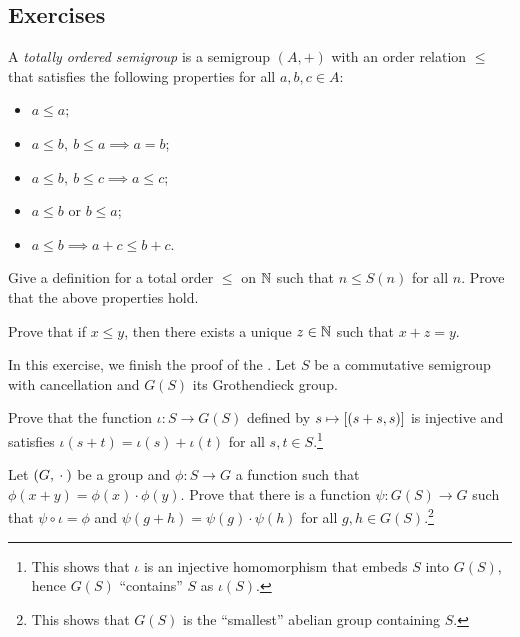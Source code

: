 \documentclass[master.tex]{subfiles}
\begin{document}
\subsection*{Exercises}
\begin{exercises}
    \item A \emph{totally ordered semigroup} is a semigroup $(A, +)$ with an order relation $\leq$ that satisfies the following properties for all $a, b, c \in A$:
    \begin{itemize}
        \item $a \leq a$;
        \item $a \leq b, \ b \leq a \implies a = b$;
        \item $a \leq b, \ b \leq c \implies a \leq c$;
        \item $a \leq b$ or $b \leq a$;
        \item $a \leq b \implies a + c \leq b + c$.
    \end{itemize}
    \begin{exercises}
        \item Give a definition for a total order $\leq$ on $\mathbb{N}$ such that $n \leq S(n)$ for all $n$.
        Prove that the above properties hold.
        \item Prove that if $x \leq y$, then there exists a unique $z \in \mathbb{N}$ such that $x + z = y$.
    \end{exercises}

    \item In this exercise, we finish the proof of the .
    Let $S$ be a commutative semigroup with cancellation and $G(S)$ its Grothendieck group.
    \begin{exercises}
        \item Prove that the function $\iota : S \rightarrow G(S)$ defined by $s \mapsto \left[ (s + s, s) \right]$ is injective and satisfies $\iota(s + t) = \iota(s) + \iota(t)$ for all $s, t \in S$.\footnote{
            This shows that $\iota$ is an injective homomorphism that embeds $S$ into $G(S)$, hence $G(S)$ ``contains'' $S$ as $\iota(S)$.
        }
        \item Let $(G, {}\cdot{}{})$ be a group and $\phi : S \rightarrow G$ a function such that $\phi(x + y) = \phi(x) \cdot \phi(y)$.
        Prove that there is a function $\psi : G(S) \rightarrow G$ such that $\psi \circ \iota = \phi$ and $\psi(g + h) = \psi(g) \cdot \psi(h)$ for all $g, h \in G(S)$.\footnote{
            This shows that $G(S)$ is the ``smallest'' abelian group containing $S$.
        }
    \end{exercises}


\end{exercises}
\end{document}
